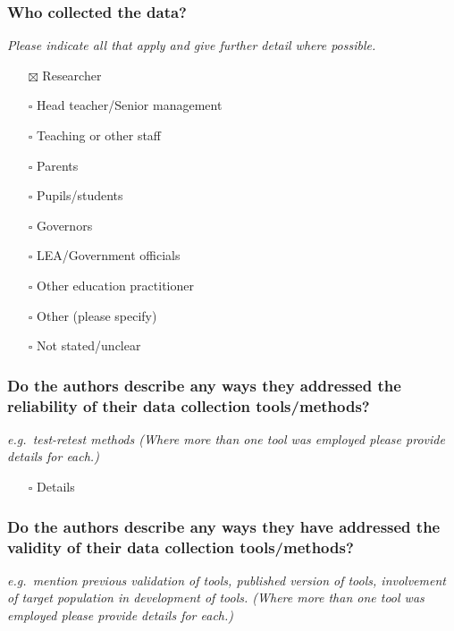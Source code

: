 \documentclass[
  doc, a4paper]{apa7}
\providecommand{\tightlist}{%
  \setlength{\itemsep}{0pt}\setlength{\parskip}{0pt}}
\begin{document}
\subsubsection{Who collected the data?}\label{who-collected-the-data}

\emph{Please indicate all that apply and give further detail where possible.}

\begin{itemize}
\tightlist
\item[$\boxtimes$]
  Researcher
\item[$\square$]
  Head teacher/Senior management
\item[$\square$]
  Teaching or other staff
\item[$\square$]
  Parents
\item[$\square$]
  Pupils/students
\item[$\square$]
  Governors
\item[$\square$]
  LEA/Government officials
\item[$\square$]
  Other education practitioner
\item[$\square$]
  Other (please specify)
\item[$\square$]
  Not stated/unclear
\end{itemize}

\subsubsection{Do the authors describe any ways they addressed the reliability of their data collection tools/methods?}\label{do-the-authors-describe-any-ways-they-addressed-the-reliability-of-their-data-collection-toolsmethods}

\emph{e.g.~test-retest methods (Where more than one tool was employed please provide details for each.)}

\begin{itemize}
\tightlist
\item[$\square$]
  Details
\end{itemize}

\subsubsection{Do the authors describe any ways they have addressed the validity of their data collection tools/methods?}\label{do-the-authors-describe-any-ways-they-have-addressed-the-validity-of-their-data-collection-toolsmethods}

\emph{e.g.~mention previous validation of tools, published version of tools, involvement of target population in development of tools. (Where more than one tool was employed please provide details for each.)}
\end{document}
